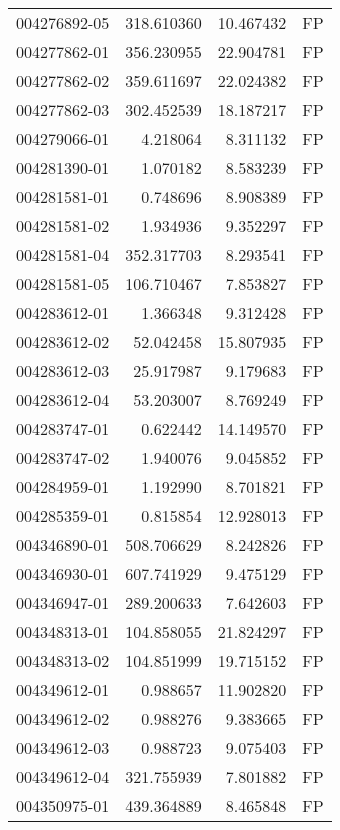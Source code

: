 \begin{tabular}{lrrl}
004276892-05 &  318.610360 &      10.467432 &   FP \\
004277862-01 &  356.230955 &      22.904781 &   FP \\
004277862-02 &  359.611697 &      22.024382 &   FP \\
004277862-03 &  302.452539 &      18.187217 &   FP \\
004279066-01 &    4.218064 &       8.311132 &   FP \\
004281390-01 &    1.070182 &       8.583239 &   FP \\
004281581-01 &    0.748696 &       8.908389 &   FP \\
004281581-02 &    1.934936 &       9.352297 &   FP \\
004281581-04 &  352.317703 &       8.293541 &   FP \\
004281581-05 &  106.710467 &       7.853827 &   FP \\
004283612-01 &    1.366348 &       9.312428 &   FP \\
004283612-02 &   52.042458 &      15.807935 &   FP \\
004283612-03 &   25.917987 &       9.179683 &   FP \\
004283612-04 &   53.203007 &       8.769249 &   FP \\
004283747-01 &    0.622442 &      14.149570 &   FP \\
004283747-02 &    1.940076 &       9.045852 &   FP \\
004284959-01 &    1.192990 &       8.701821 &   FP \\
004285359-01 &    0.815854 &      12.928013 &   FP \\
004346890-01 &  508.706629 &       8.242826 &   FP \\
004346930-01 &  607.741929 &       9.475129 &   FP \\
004346947-01 &  289.200633 &       7.642603 &   FP \\
004348313-01 &  104.858055 &      21.824297 &   FP \\
004348313-02 &  104.851999 &      19.715152 &   FP \\
004349612-01 &    0.988657 &      11.902820 &   FP \\
004349612-02 &    0.988276 &       9.383665 &   FP \\
004349612-03 &    0.988723 &       9.075403 &   FP \\
004349612-04 &  321.755939 &       7.801882 &   FP \\
004350975-01 &  439.364889 &       8.465848 &   FP \\

\end{tabular}
